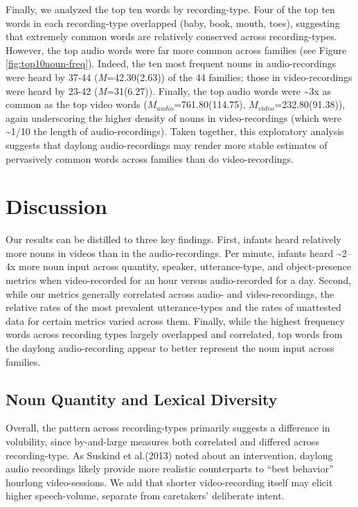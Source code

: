 \documentclass[man]{apa6}
\theoremstyle{definition}
\theoremstyle{definition}
\theoremstyle{definition}
\theoremstyle{remark}
\begin{document}
Finally, we analyzed the top ten words by recording-type. Four of the
top ten words in each recording-type overlapped (baby, book, mouth,
toes), suggesting that extremely common words are relatively conserved
across recording-types. However, the top audio words were far more
common across families (see Figure \ref{fig:top10noun-freq}). Indeed,
the ten most frequent nouns in audio-recordings were heard by 37-44
(\emph{M}=42.30(2.63)) of the 44 families; those in video-recordings
were heard by 23-42 (\emph{M}=31(6.27)). Finally, the top audio words
were \textasciitilde{}3x as common as the top video words
(\(M_{audio}\)=761.80(114.75), \(M_{video}\)=232.80(91.38)), again
underscoring the higher density of nouns in video-recordings (which were
\textasciitilde{}1/10 the length of audio-recordings). Taken together,
this exploratory analysis suggests that daylong audio-recordings may
render more stable estimates of pervasively common words across families
than do video-recordings.

\section{Discussion}\label{discussion}

Our results can be distilled to three key findings. First, infants heard
relatively more nouns in videos than in the audio-recordings. Per
minute, infants heard \textasciitilde{}2--4x more noun input across
quantity, speaker, utterance-type, and object-presence metrics when
video-recorded for an hour versus audio-recorded for a day. Second,
while our metrics generally correlated across audio- and
video-recordings, the relative rates of the most prevalent
utterance-types and the rates of unattested data for certain metrics
varied across them. Finally, while the highest frequency words across
recording types largely overlapped and correlated, top words from the
daylong audio-recording appear to better represent the noun input across
families.

\subsection{Noun Quantity and Lexical
Diversity}\label{noun-quantity-and-lexical-diversity}

Overall, the pattern across recording-types primarily suggests a
difference in volubility, since by-and-large measures both correlated
and differed across recording-type. As Suskind et al.(2013) noted about
an intervention, daylong audio recordings likely provide more realistic
counterparts to \enquote{best behavior} hourlong video-sessions. We add
that shorter video-recording itself may elicit higher speech-volume,
separate from caretakers' deliberate intent.
\end{document}
